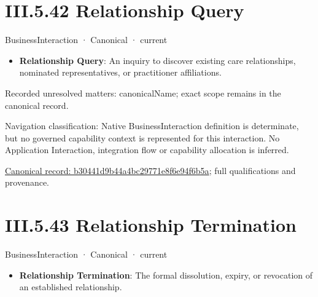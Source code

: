 \section*{III.5.42 Relationship Query}
\label{navigation:III.5.42}

\label{element:b30441d9b44a4bc29771e8f6e94f6b5a}
{\small BusinessInteraction · Canonical · current}\par

\begin{itemize}


\item \textbf{Relationship Query}: An inquiry to discover existing care relationships, nominated representatives, or practitioner affiliations.

\end{itemize}

{\small Recorded unresolved matters: canonicalName; exact scope remains in the canonical record.}\par
{\small Navigation classification: Native BusinessInteraction definition is determinate, but no governed capability context is represented for this interaction. No Application Interaction, integration flow or capability allocation is inferred.}\par
{\footnotesize \href{../../../../../../../../continuum/business/business-interaction/b30441d9b44a4bc29771e8f6e94f6b5a.md}{Canonical record: b30441d9b44a4bc29771e8f6e94f6b5a}; full qualifications and provenance.}\par
\section*{III.5.43 Relationship Termination}
\label{navigation:III.5.43}

\label{element:e536ab3a1bbe4a36a99635458ba208f6}
{\small BusinessInteraction · Canonical · current}\par

\begin{itemize}


\item \textbf{Relationship Termination}: The formal dissolution, expiry, or revocation of an established relationship.

\end{itemize}

